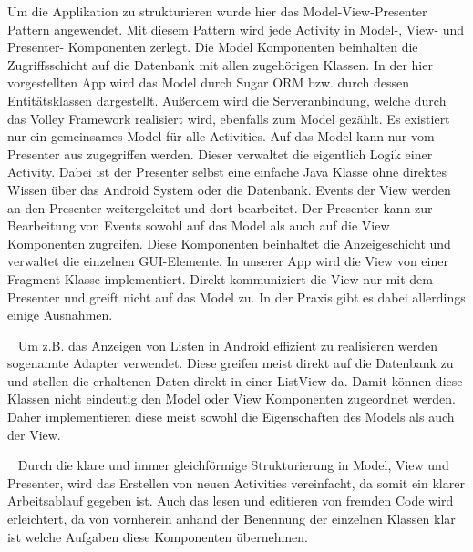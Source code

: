 \documentclass{scrartcl}
\begin{document}
\noindent
Um die Applikation zu strukturieren wurde hier das Model-View-Presenter Pattern
angewendet. Mit diesem Pattern wird jede Activity in Model-, View- und
Presenter- Komponenten zerlegt. Die Model Komponenten beinhalten die
Zugriffsschicht auf die Datenbank mit allen zugehörigen Klassen. In der hier
vorgestellten App wird das Model durch Sugar ORM bzw. durch dessen
Entitätsklassen dargestellt. Außerdem wird die Serveranbindung, welche durch das
Volley Framework realisiert wird, ebenfalls zum Model gezählt. Es existiert
nur ein gemeinsames Model für alle Activities. Auf das Model kann nur vom
Presenter aus zugegriffen werden. Dieser verwaltet die
eigentlich Logik einer Activity. Dabei ist der Presenter selbst eine einfache
Java Klasse ohne direktes Wissen über das Android System oder die Datenbank.
Events der View werden an den Presenter weitergeleitet und dort bearbeitet. Der
Presenter kann zur Bearbeitung von Events sowohl auf das Model als auch auf die
View Komponenten zugreifen. Diese Komponenten beinhaltet die Anzeigeschicht und
verwaltet die einzelnen GUI-Elemente. In unserer App wird die View von einer
Fragment Klasse implementiert. Direkt kommuniziert die View nur mit dem
Presenter und greift nicht auf das Model zu. In der Praxis gibt es dabei
allerdings einige Ausnahmen.

\ \newline
Um z.B. das Anzeigen von Listen in Android effizient zu realisieren werden
sogenannte Adapter verwendet. Diese greifen meist direkt auf die Datenbank zu
und stellen die erhaltenen Daten direkt in einer ListView da. Damit können diese
Klassen nicht eindeutig den Model oder View Komponenten zugeordnet werden. Daher
implementieren diese meist sowohl die Eigenschaften des Models als auch der
View.

\ \newline
Durch die klare und immer gleichförmige Strukturierung in Model, View und
Presenter, wird das Erstellen von neuen Activities vereinfacht, da somit ein
klarer Arbeitsablauf gegeben ist. Auch das lesen und editieren von fremden Code
wird erleichtert, da von vornherein anhand der Benennung der einzelnen Klassen
klar ist welche Aufgaben diese Komponenten übernehmen.
\end{document}
